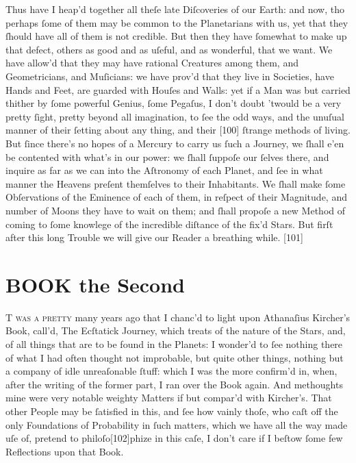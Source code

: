 \documentclass[letterpaper]{book}
\begin{document}
Thus have I heap'd together all theſe late Diſcoveries of our Earth: and
now, tho perhaps ſome of them may be common to the Planetarians with
us, yet that they ſhould have all of them is not credible. But then they
have ſomewhat to make up that defect, others as good and as uſeful, and
as wonderful, that we want. We have allow'd that they may have rational
Creatures among them, and Geometricians, and Muſicians: we have prov'd
that they live in Societies, have Hands and Feet, are guarded with Houſes
and Walls: yet if a Man was but carried thither by ſome powerful Genius,
ſome Pegaſus, I don't doubt 'twould be a very pretty ſight, pretty beyond
all imagination, to ſee the odd ways, and the unuſual manner of their ſetting
about any thing, and their [100] ſtrange methods of living. But ſince there's
no hopes of a Mercury to carry us ſuch a Journey, we ſhall e'en be contented
with what's in our power: we ſhall ſuppoſe our ſelves there, and inquire as
far as we can into the Aſtronomy of each Planet, and ſee in what manner
the Heavens preſent themſelves to their Inhabitants. We ſhall make ſome
Obſervations of the Eminence of each of them, in reſpect of their Magnitude,
and number of Moons they have to wait on them; and ſhall propoſe a new
Method of coming to ſome knowlege of the incredible diſtance of the fix'd
Stars. But firſt after this long Trouble we will give our Reader a breathing
while.  [101]






\chapter{BOOK the Second}

\lettrine[lines=6, lraise=.26, ante={\fontsize{48}{48}\fontspec{EB
Garamond}'}]{ T}{
was a pretty } many years ago that I chanc'd to light upon Athanaſius
Kircher's Book, call'd, The Ecſtatick Journey, which treats of the nature of
the Stars, and, of all things that are to be found in the Planets: I wonder'd
to ſee nothing there of what I had often thought not improbable, but quite
other things, nothing but a company of idle unreaſonable ſtuff: which I
was the more confirm'd in, when, after the writing of the former part, I
ran over the Book again. And methoughts mine were very notable weighty
Matters if but compar'd with Kircher's. That other People may be ſatisfied
in this, and ſee how vainly thoſe, who caſt off the only Foundations of
Probability in ſuch matters, which we have all the way made uſe of, pretend
to philoſo[102]phize in this caſe, I don't care if I beſtow ſome few Reflections
upon that Book.  
\end{document}
